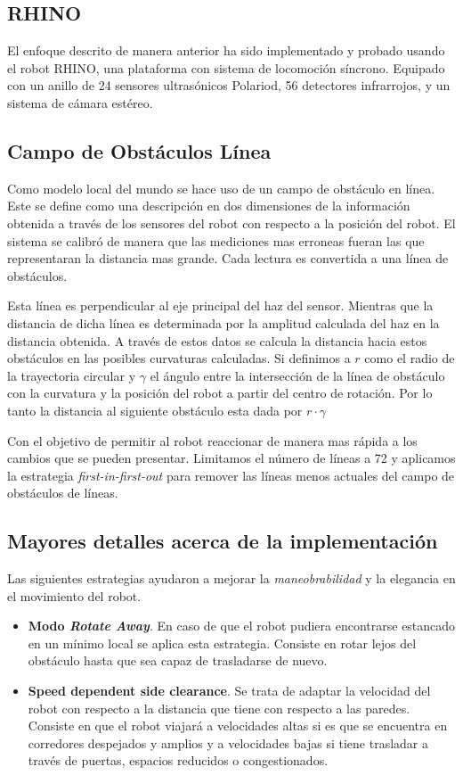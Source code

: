 \documentclass[12pt]{article}
\begin{document}
\subsection{RHINO}
El enfoque descrito de manera anterior ha sido implementado y probado usando el robot RHINO, una plataforma con sistema de locomoción síncrono. Equipado con un anillo de 24 sensores ultrasónicos Polariod, 56 detectores infrarrojos, y un sistema de cámara estéreo.

\subsection{Campo de Obstáculos Línea}
Como modelo local del mundo se hace uso de un campo de obstáculo en línea. Este se define como una descripción en dos dimensiones de la información obtenida a través de los sensores del robot con respecto a la posición del robot. El sistema se calibró de manera que las mediciones mas erroneas fueran las que representaran la distancia mas grande. Cada lectura es convertida a una línea de obstáculos. 

Esta línea es perpendicular al eje principal del haz del sensor. Mientras que la distancia de dicha línea es determinada por la amplitud calculada del haz en la distancia obtenida. A través de estos datos se calcula la distancia hacia estos obstáculos en las posibles curvaturas calculadas. Si definimos a \boldmath$r$ como el radio de la trayectoria circular  y \boldmath$\gamma$ el ángulo entre la intersección de la línea de obstáculo con la curvatura y la posición del robot a partir del centro de rotación. Por lo tanto la distancia al siguiente obstáculo esta dada por \boldmath$r \cdot \gamma$

Con el objetivo de permitir al robot reaccionar de manera mas rápida a los cambios que se pueden presentar. Limitamos el número de líneas a 72 y aplicamos la estrategia \emph{first-in-first-out} para remover las líneas menos actuales del campo de obstáculos de líneas. 

\subsection{Mayores detalles acerca de la implementación}
Las siguientes estrategias ayudaron a mejorar la \emph{maneobrabilidad} y la elegancia en el movimiento del robot.

\begin{itemize}
	\item \textbf{Modo \emph{Rotate Away}}. En caso de que el robot pudiera encontrarse estancado en un mínimo local se aplica esta estrategia. Consiste en rotar lejos del obstáculo hasta que sea capaz de trasladarse de nuevo.
	\item \textbf{Speed dependent side clearance}. Se trata de adaptar la velocidad del robot con respecto a la distancia que tiene con respecto a las paredes. Consiste en que el robot viajará a velocidades altas si es que se encuentra en corredores despejados y amplios y a velocidades bajas si tiene trasladar a través de puertas, espacios reducidos o congestionados.
\end{itemize}
\end{document}
